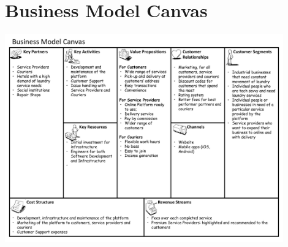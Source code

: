 \chapter{Business Model Canvas} %

\label{AppendixC} 

 \includegraphics[page=1, angle=90,origin=c, width=0.9\textwidth ]{appendices/files/Canvas.pdf}

